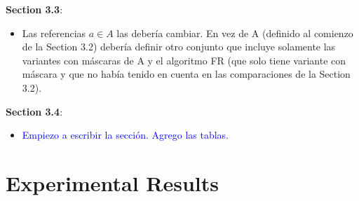 \vspace{+5pt}
\textbf{Section 3.3}:
\vspace{-10pt}
\begin{itemize}
    \item Las referencias $a \in A$ las debería cambiar. En vez de A (definido al comienzo de la Section 3.2) debería definir otro conjunto que incluye solamente las variantes con máscaras de A y el algoritmo FR (que solo tiene variante con máscara y que no había tenido en cuenta en las comparaciones de la Section 3.2).
\end{itemize}

\vspace{+5pt}
\textbf{Section 3.4}:
\vspace{-10pt}
\begin{itemize}
    \item \textcolor{blue}{Empiezo a escribir la sección. Agrego las tablas.}
\end{itemize}



\chapter{Experimental Results} %

\label{experiments} %


\newcommand{\maskalgo}{\textit{M}}
\newcommand{\NOmaskalgo}{\textit{NM}}
\newcommand{\coder}{\textit{c}}
\newcommand{\difrelativa}{\textit{RD}}
\newcommand{\tasacompresion}{\textit{CR}}
\newcommand{\nmbits}{\NOmaskalgo_{\textit{S}}}
\newcommand{\mbits}{\maskalgo_\textit{S}}
\newcommand{\cmaskalgo}{$c_\maskalgo$}
\newcommand{\cNOmaskalgo}{$c_\NOmaskalgo$}
\newcommand{\ca}{\textit{CI}}
\newcommand{\algo}{\textit{c}}







